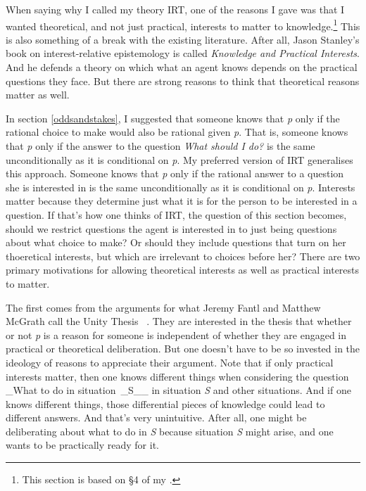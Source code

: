 \documentclass[
  11pt,
]{book}
\begin{document}
When saying why I called my theory IRT, one of the reasons I gave was that I wanted theoretical, and not just practical, interests to matter to knowledge.\footnote{This section is based on §4 of my \citeyearpar{Weatherson2017-WEAII}.} This is also something of a break with the existing literature. After all, Jason Stanley's book on interest-relative epistemology is called \emph{Knowledge and Practical Interests}. And he defends a theory on which what an agent knows depends on the practical questions they face. But there are strong reasons to think that theoretical reasons matter as well.

In section \ref{oddsandstakes}, I suggested that someone knows that \emph{p} only if the rational choice to make would also be rational given \emph{p}. That is, someone knows that \emph{p} only if the answer to the question \emph{What should I do?} is the same unconditionally as it is conditional on \emph{p}. My preferred version of IRT generalises this approach. Someone knows that \emph{p} only if the rational answer to a question she is interested in is the same unconditionally as it is conditional on \emph{p}. Interests matter because they determine just what it is for the person to be interested in a question. If that's how one thinks of IRT, the question of this section becomes, should we restrict questions the agent is interested in to just being questions about what choice to make? Or should they include questions that turn on her thoeretical interests, but which are irrelevant to choices before her? There are two primary motivations for allowing theoretical interests as well as practical interests to matter.

The first comes from the arguments for what Jeremy Fantl and Matthew McGrath call the Unity Thesis ~\citep[ 73-76]{FantlMcGrath2009}. They are interested in the thesis that whether or not \emph{p} is a reason for someone is independent of whether they are engaged in practical or theoretical deliberation. But one doesn't have to be so invested in the ideology of reasons to appreciate their argument. Note that if only practical interests matter, then one knows different things when considering the question \_What to do in situation~\_S\_\_ in situation \emph{S} and other situations. And if one knows different things, those differential pieces of knowledge could lead to different answers. And that's very unintuitive. After all, one might be deliberating about what to do in \emph{S} because situation \emph{S} might arise, and one wants to be practically ready for it.
\end{document}
